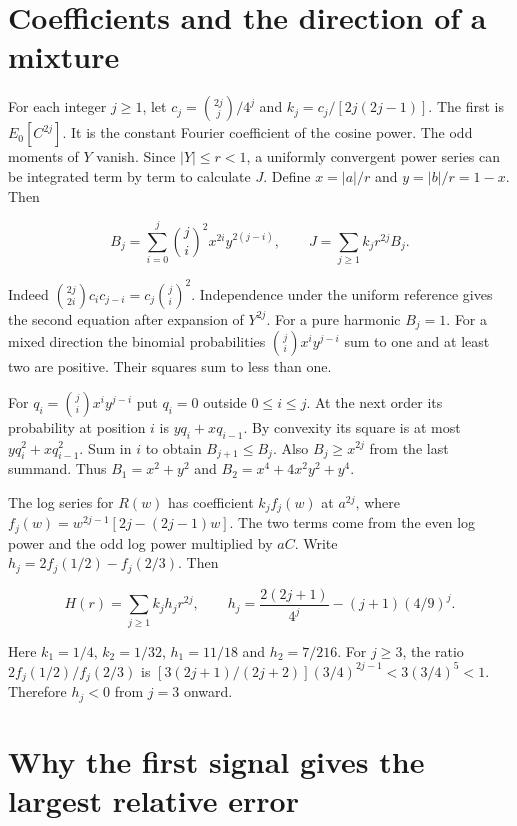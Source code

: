 \clearpage

\section{Coefficients and the direction of a mixture}\label{coefficients-and-the-direction-of-a-mixture}

For each integer \(j\ge1\), let \(c_j=\binom{2j}{j}/4^j\) and \(k_j=c_j/[2j(2j-1)]\). The first is \(E_0[C^{2j}]\). It is the constant Fourier coefficient of the cosine power. The odd moments of \(Y\) vanish. Since \(|Y|\le r<1\), a uniformly convergent power series can be integrated term by term to calculate \(J\). Define \(x=|a|/r\) and \(y=|b|/r=1-x\). Then

\[
B_j=\sum_{i=0}^{j}\binom ji^2 x^{2i}y^{2(j-i)},\qquad
J=\sum_{j\ge1} k_j r^{2j}B_j .
\]

Indeed \(\binom{2j}{2i}c_i c_{j-i}=c_j\binom ji^2\). Independence under the uniform reference gives the second equation after expansion of \(Y^{2j}\). For a pure harmonic \(B_j=1\). For a mixed direction the binomial probabilities \(\binom ji x^i y^{j-i}\) sum to one and at least two are positive. Their squares sum to less than one.

For \(q_i=\binom ji x^i y^{j-i}\) put \(q_i=0\) outside \(0\le i\le j\). At the next order its probability at position \(i\) is \(yq_i+xq_{i-1}\). By convexity its square is at most \(yq_i^2+xq_{i-1}^2\). Sum in \(i\) to obtain \(B_{j+1}\le B_j\). Also \(B_j\ge x^{2j}\) from the last summand. Thus \(B_1=x^2+y^2\) and \(B_2=x^4+4x^2y^2+y^4\).

The log series for \(R(w)\) has coefficient \(k_j f_j(w)\) at \(a^{2j}\), where \(f_j(w)=w^{2j-1}[2j-(2j-1)w]\). The two terms come from the even log power and the odd log power multiplied by \(aC\). Write \(h_j=2f_j(1/2)-f_j(2/3)\). Then

\[
H(r)=\sum_{j\ge1} k_j h_j r^{2j},\qquad
h_j=\frac{2(2j+1)}{4^j}-(j+1)(4/9)^j .
\]

Here \(k_1=1/4\), \(k_2=1/32\), \(h_1=11/18\) and \(h_2=7/216\). For \(j\ge3\), the ratio \(2f_j(1/2)/f_j(2/3)\) is \([3(2j+1)/(2j+2)](3/4)^{2j-1}<3(3/4)^5<1\). Therefore \(h_j<0\) from \(j=3\) onward.

\clearpage

\section{Why the first signal gives the largest relative error}\label{why-the-first-signal-gives-the-largest-relative-error}

